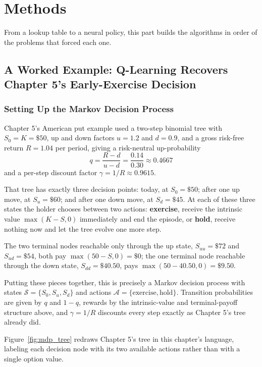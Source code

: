 \documentclass[../ai_in_finance]{subfiles}
\begin{document}
\section{Methods}

From a lookup table to a neural policy, this part builds the algorithms in order of the problems that forced each one.

\subsection{A Worked Example: Q-Learning Recovers Chapter 5's Early-Exercise Decision}
\label{sec:rl-qlearning}

\subsubsection*{Setting Up the Markov Decision Process}

Chapter 5's American put example used a two-step binomial tree with $S_0 = K = \$50$, up and down factors $u=1.2$ and $d=0.9$, and a gross risk-free return $R=1.04$ per period,
giving a risk-neutral up-probability
$$q = \frac{R-d}{u-d} = \frac{0.14}{0.30} \approx 0.4667$$
 and a per-step discount factor $\gamma = 1/R \approx 0.9615$.

That tree has exactly three decision points: today, at $S_0=\$50$; after one up move, at $S_u=\$60$; and after one down move, at $S_d=\$45$. At each of these
three states the holder chooses between two actions: \textbf{exercise}, receive the intrinsic value $\max(K-S,0)$ immediately and end the episode, or
\textbf{hold}, receive nothing now and let the tree evolve one more step.

The two terminal nodes reachable only through the up state, $S_{uu}=\$72$ and $S_{ud}=\$54$, both pay $\max(50-S,0)=\$0$; the one terminal node reachable
through the down state, $S_{dd}=\$40.50$, pays $\max(50-40.50,0)=\$9.50$.

Putting these pieces together, this is precisely a Markov decision process with states $\mathcal{S}=\{S_0, S_u, S_d\}$ and actions $\mathcal{A}=\{\text{exercise}, \text{hold}\}$. Transition probabilities are given by $q$ and $1-q$, rewards by the intrinsic-value and terminal-payoff structure above, and $\gamma=1/R$ discounts every step exactly as Chapter 5's tree already did.

Figure~\ref{fig:mdp_tree} redraws Chapter 5's tree in this chapter's language, labeling each decision node with its two available actions rather than with a single option value.
\end{document}
